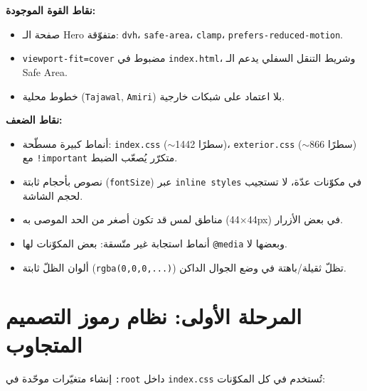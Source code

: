 \documentclass[11pt]{article}
\begin{document}
\begin{notebox}
\textbf{نقاط القوة الموجودة:}
\begin{itemize}
  \item صفحة الـ Hero متفوّقة: \texttt{dvh}، \texttt{safe-area}، \texttt{clamp}، \texttt{prefers-reduced-motion}.
  \item \texttt{viewport-fit=cover} مضبوط في \texttt{index.html}، وشريط التنقل السفلي يدعم الـ Safe Area.
  \item خطوط محلية (\texttt{Tajawal}, \texttt{Amiri}) بلا اعتماد على شبكات خارجية.
\end{itemize}

\vspace{4pt}
\textbf{نقاط الضعف:}
\begin{itemize}
  \item أنماط كبيرة مسطّحة: \texttt{index.css} ($\sim$1442 سطرًا)، \texttt{exterior.css} ($\sim$866 سطرًا)
        مع \texttt{!important} متكرّر يُصعّب الضبط.
  \item نصوص بأحجام ثابتة (\texttt{fontSize}) عبر \texttt{inline styles} في مكوّنات عدّة، لا تستجيب لحجم الشاشة.
  \item مناطق لمس قد تكون أصغر من الحد الموصى به (44$\times$44px) في بعض الأزرار.
  \item أنماط استجابة غير متّسقة: بعض المكوّنات لها \texttt{@media} وبعضها لا.
  \item ألوان الظلّ ثابتة (\texttt{rgba(0,0,0,...)}) تظلّ ثقيلة/باهتة في وضع الجوال الداكن.
\end{itemize}
\end{notebox}

\section{المرحلة الأولى: نظام رموز التصميم المتجاوب}

إنشاء متغيّرات موحّدة في \texttt{:root} داخل \texttt{index.css} تُستخدم في كل المكوّنات:
\end{document}
